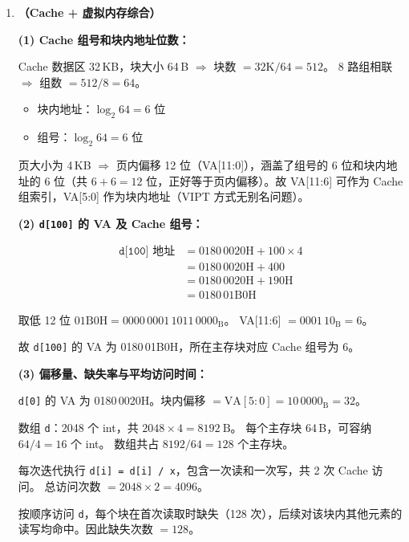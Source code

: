 \documentclass[12pt,a4paper]{ctexart}
\begin{document}
\begin{enumerate}[leftmargin=*,resume]

\item \textbf{（Cache + 虚拟内存综合）}

\medskip
\textbf{(1) Cache 组号和块内地址位数：}

Cache 数据区 32\,KB，块大小 64\,B $\Rightarrow$ 块数 $= 32\mathrm{K}/64 = 512$。
8 路组相联 $\Rightarrow$ 组数 $= 512/8 = 64$。

\begin{itemize}
\item 块内地址：$\log_2 64 = 6$ 位
\item 组号：$\log_2 64 = 6$ 位
\end{itemize}

页大小为 4\,KB $\Rightarrow$ 页内偏移 12 位（VA[11:0]），涵盖了组号的 6 位和块内地址的 6 位（共 $6+6=12$ 位，正好等于页内偏移）。故 VA[11:6] 可作为 Cache 组索引，VA[5:0] 作为块内地址（VIPT 方式无别名问题）。

\textbf{(2) \texttt{d[100]} 的 VA 及 Cache 组号：}

\begin{align*}
\texttt{d[100]} \text{ 地址} &= \mathrm{0180\,0020H} + 100 \times 4 \\
&= \mathrm{0180\,0020H} + 400 \\
&= \mathrm{0180\,0020H} + \mathrm{190H} \\
&= \mathrm{0180\,01B0H}
\end{align*}

取低 12 位 $\mathrm{01B0H} = 0000\,0001\,1011\,0000_{\mathrm{B}}$。
VA[11:6] $= 0001\,10_{\mathrm{B}} = 6$。

故 \texttt{d[100]} 的 VA 为 0180\,01B0H，所在主存块对应 Cache 组号为 6。

\textbf{(3) 偏移量、缺失率与平均访问时间：}

\texttt{d[0]} 的 VA 为 0180\,0020H。块内偏移 $= \mathrm{VA}[5:0] = 10\,0000_{\mathrm{B}} = 32$。

数组 \texttt{d}：2048 个 int，共 $2048 \times 4 = 8192\:\mathrm{B}$。
每个主存块 64\,B，可容纳 $64/4 = 16$ 个 int。
数组共占 $8192/64 = 128$ 个主存块。

每次迭代执行 \texttt{d[i] = d[i] / x}，包含一次读和一次写，共 2 次 Cache 访问。
总访问次数 $= 2048 \times 2 = 4096$。

按顺序访问 \texttt{d}，每个块在首次读取时缺失（128 次），后续对该块内其他元素的读写均命中。因此缺失次数 $= 128$。


\end{enumerate}
\end{document}
